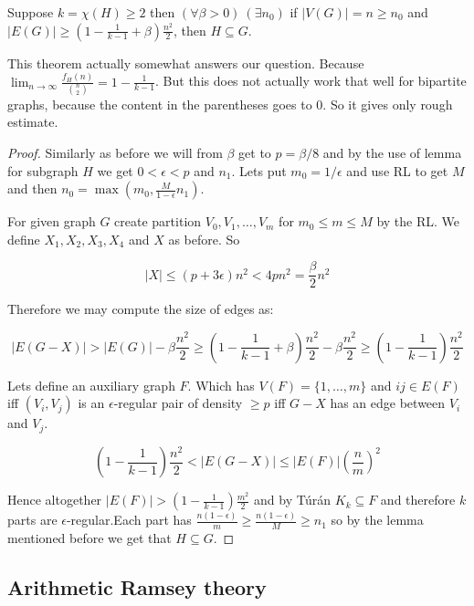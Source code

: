 \begin{thm}
	Suppose $k = \chi(H) \geq 2$ then $(\forall \beta > 0) \ (\exists n_0)$ if $|V(G)| = n \geq n_0$ and $|E(G)| \geq \left(1 - \frac{1}{k-1} + \beta \right) \frac{n^2}{2}$, then $H \subseteq G$.
\end{thm}

This theorem actually somewhat answers our question. Because $\lim_{n \to \infty} \frac{f_H (n)}{\binom{n}{2}} = 1 - \frac{1}{k-1}$. But this does not actually work that well for bipartite graphs, because the content in the parentheses goes to 0. So it gives only rough estimate.

\begin{proof}
	Similarly as before we will from $\beta$ get to $p = \beta/8$ and by the use of lemma for subgraph $H$ we get $0 < \epsilon < p$ and $n_1$. Lets put $m_0 = 1/\epsilon$ and use RL to get $M$ and then $n_0 = \max \left(m_0, \frac{M}{1-\epsilon} n_1 \right)$.
	
	For given graph $G$ create partition $V_0, V_1, \dots, V_m$ for $m_0 \leq m \leq M$ by the RL. We define $X_1,X_2,X_3,X_4$ and $X$ as before. So
	
	$$
	|X| \leq (p + 3\epsilon) n^2 < 4pn^2 = \frac{\beta}{2}n^2
	$$
	
	Therefore we may compute the size of edges as:
	
	$$
	|E(G-X)| > |E(G)| - \beta \frac{n^2}{2} \geq \left( 1 - \frac{1}{k-1} + \beta \right) \frac{n^2}{2} - \beta \frac{n^2}{2} \geq \left( 1 - \frac{1}{k-1} \right) \frac{n^2}{2}
	$$
	
	Lets define an auxiliary graph $F$. Which has $V(F) = \{1, \dots, m\}$ and $ij \in E(F)$ iff $(V_i,V_j)$ is an $\epsilon$-regular pair of density $\geq p$ iff $G-X$ has an edge between $V_i$ and $V_j$.
	
	$$
	\left( 1 - \frac{1}{k-1} \right) \frac{n^2}{2} < |E(G-X)| \leq |E(F)| \left(\frac{n}{m}\right)^2
	$$
	
	Hence altogether $|E(F)| > \left(1-\frac{1}{k-1}\right) \frac{m^2}{2}$ and by Túrán $K_k \subseteq F$ and therefore $k$ parts are $\epsilon$-regular.Each part has $\frac{n(1-\epsilon)}{m} \geq \frac{n(1-\epsilon)}{M} \geq n_1$ so by the lemma mentioned before we get that $H \subseteq G$.
\end{proof}

\subsection{Arithmetic Ramsey theory}

